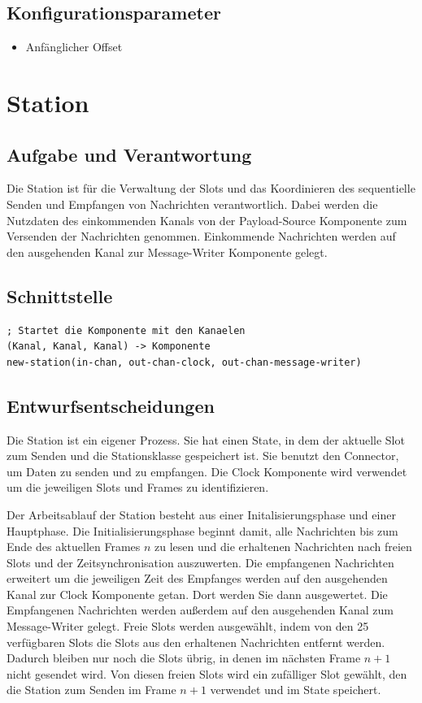 \documentclass[draft=false
              ,paper=a4
              ,twoside=false
              ,fontsize=11pt
              ,headsepline
              ,BCOR10mm
              ,DIV11
              ]{scrbook}
\begin{document}
\subsection{Konfigurationsparameter}
\begin{itemize}
    \item Anfänglicher Offset
\end{itemize}

\section{Station}
\subsection{Aufgabe und Verantwortung}
Die Station ist für die Verwaltung der Slots und das Koordinieren des sequentielle Senden und Empfangen von Nachrichten verantwortlich. Dabei werden die Nutzdaten des einkommenden Kanals von der Payload-Source Komponente zum Versenden der Nachrichten genommen.
Einkommende Nachrichten werden auf den ausgehenden Kanal zur Message-Writer Komponente gelegt.

\subsection{Schnittstelle}
\begin{lstlisting}
; Startet die Komponente mit den Kanaelen
(Kanal, Kanal, Kanal) -> Komponente
new-station(in-chan, out-chan-clock, out-chan-message-writer)
\end{lstlisting}

\subsection{Entwurfsentscheidungen}
Die Station ist ein eigener Prozess. Sie hat einen State, in dem der aktuelle Slot zum Senden und die Stationsklasse gespeichert ist. Sie benutzt den Connector, um Daten zu senden und zu empfangen. Die Clock Komponente wird verwendet um die jeweiligen Slots und Frames zu identifizieren.

Der Arbeitsablauf der Station besteht aus einer Initalisierungsphase und einer Hauptphase.
Die Initialisierungsphase beginnt damit, alle Nachrichten bis zum Ende des aktuellen Frames $n$ zu lesen und die erhaltenen Nachrichten nach freien Slots und der Zeitsynchronisation auszuwerten.
Die empfangenen Nachrichten erweitert um die jeweiligen Zeit des Empfanges werden auf den ausgehenden Kanal zur Clock Komponente getan. Dort werden Sie dann ausgewertet. Die Empfangenen Nachrichten werden außerdem auf den ausgehenden Kanal zum Message-Writer gelegt.
Freie Slots werden ausgewählt, indem von den 25 verfügbaren Slots die Slots aus den erhaltenen Nachrichten entfernt werden. Dadurch bleiben nur noch die Slots übrig, in denen im nächsten Frame $n + 1$ nicht gesendet wird. Von diesen freien Slots wird ein zufälliger Slot gewählt, den die Station zum Senden im Frame $n + 1$ verwendet und im State speichert.
\end{document}
